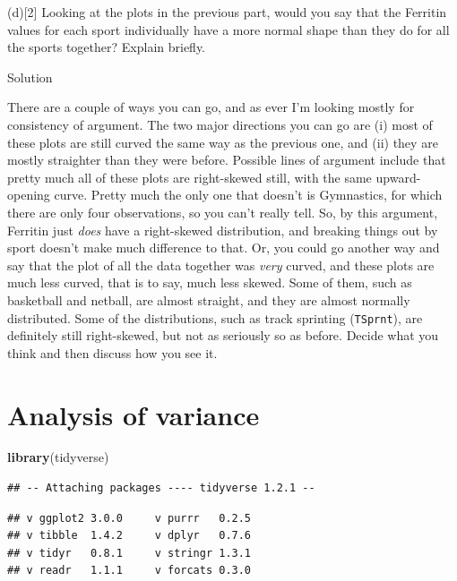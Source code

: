 \documentclass[]{tufte-book}
\newenvironment{Shaded}{}{}
\newcommand{\KeywordTok}[1]{\textcolor[rgb]{0.00,0.44,0.13}{\textbf{#1}}}
\newcommand{\NormalTok}[1]{#1}
\theoremstyle{definition}
\theoremstyle{definition}
\theoremstyle{definition}
\theoremstyle{remark}
\begin{document}
(d){[}2{]} Looking at the plots in the previous part, would you say that
the Ferritin values for each sport individually have a more normal shape
than they do for all the sports together? Explain briefly.

Solution

There are a couple of ways you can go, and as ever I'm looking mostly
for consistency of argument. The two major directions you can go are (i)
most of these plots are still curved the same way as the previous one,
and (ii) they are mostly straighter than they were before. Possible
lines of argument include that pretty much all of these plots are
right-skewed still, with the same upward-opening curve. Pretty much the
only one that doesn't is Gymnastics, for which there are only four
observations, so you can't really tell. So, by this argument, Ferritin
just \emph{does} have a right-skewed distribution, and breaking things
out by sport doesn't make much difference to that. Or, you could go
another way and say that the plot of all the data together was
\emph{very} curved, and these plots are much less curved, that is to
say, much less skewed. Some of them, such as basketball and netball, are
almost straight, and they are almost normally distributed. Some of the
distributions, such as track sprinting (\texttt{TSprnt}), are definitely
still right-skewed, but not as seriously so as before. Decide what you
think and then discuss how you see it.

\hypertarget{analysis-of-variance}{%
\chapter{Analysis of variance}\label{analysis-of-variance}}

\begin{Shaded}
\begin{Highlighting}[]
\KeywordTok{library}\NormalTok{(tidyverse)}
\end{Highlighting}
\end{Shaded}

\begin{verbatim}
## -- Attaching packages ---- tidyverse 1.2.1 --
\end{verbatim}

\begin{verbatim}
## v ggplot2 3.0.0     v purrr   0.2.5
## v tibble  1.4.2     v dplyr   0.7.6
## v tidyr   0.8.1     v stringr 1.3.1
## v readr   1.1.1     v forcats 0.3.0
\end{verbatim}
\end{document}

